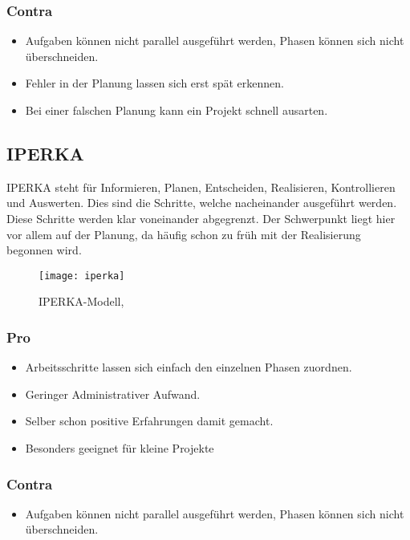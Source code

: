 \subsubsection{Contra}
\begin{itemize}
\item Aufgaben können nicht parallel ausgeführt werden, Phasen können sich nicht überschneiden.
\item Fehler in der Planung lassen sich erst spät erkennen.
\item Bei einer falschen Planung kann ein Projekt schnell ausarten. \cite{wiki:Wasserfallmodell}
\end{itemize}
\subsection{IPERKA}
IPERKA steht für Informieren, Planen, Entscheiden, Realisieren, Kontrollieren und Auswerten. Dies sind die Schritte, welche nacheinander ausgeführt werden. Diese Schritte werden klar voneinander abgegrenzt. Der Schwerpunkt liegt hier vor allem auf der Planung, da häufig schon zu früh mit der Realisierung begonnen wird.
\begin{figure}[H]
	\centering
	\texttt{[image: iperka]}
	\caption{IPERKA-Modell, \cite{web:iperkaimage}}
\end{figure}
\subsubsection{Pro}
\begin{itemize}
\item Arbeitsschritte lassen sich einfach den einzelnen Phasen zuordnen.
\item Geringer Administrativer Aufwand.
\item Selber schon positive Erfahrungen damit gemacht.
\item Besonders geeignet für kleine Projekte
\end{itemize}
\subsubsection{Contra}
\begin{itemize}
\item Aufgaben können nicht parallel ausgeführt werden, Phasen können sich nicht überschneiden. \cite{web:iperka}
\end{itemize}
